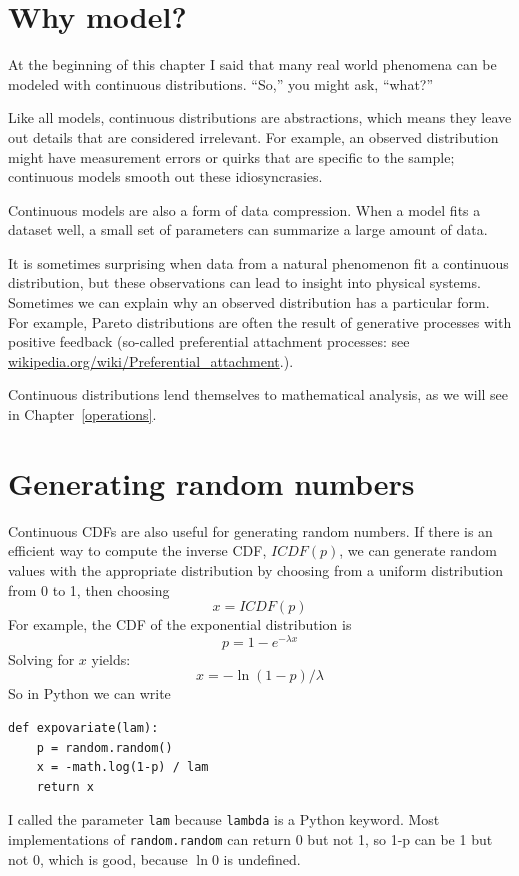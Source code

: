 \documentclass[12pt]{book}
\begin{document}
\section{Why model?}

At the beginning of this chapter I said that many real world phenomena
can be modeled with continuous distributions.  ``So,'' you might ask,
``what?''

Like all models, continuous distributions are abstractions, which
means they leave out details that are considered irrelevant.
For example, an observed distribution might have measurement errors
or quirks that are specific to the sample; continuous models smooth
out these idiosyncrasies.

Continuous models are also a form of data compression.  When a model
fits a dataset well, a small set of parameters can summarize a
large amount of data.

It is sometimes surprising when data from a natural phenomenon fit a
continuous distribution, but these observations can lead to insight
into physical systems.  Sometimes we can explain why an observed
distribution has a particular form.  For example, Pareto distributions
are often the result of generative processes with positive feedback
(so-called preferential attachment processes: see
\url{wikipedia.org/wiki/Preferential_attachment}.).

Continuous distributions lend themselves to mathematical analysis, as
we will see in Chapter~\ref{operations}.


\section{Generating random numbers}

Continuous CDFs are also useful for generating random numbers.
If there is an efficient way to compute the inverse CDF, $ICDF(p)$,
we can generate random values with the appropriate distribution
by choosing from a uniform distribution from 0 to 1, then choosing
%
\[ x = ICDF(p) \]
%
For example, the CDF of the exponential distribution is
%
\[ p = 1 - e^{-\lambda x} \]
%
Solving for $x$ yields:
%
\[ x = -\ln (1-p) / \lambda \]
%
So in Python we can write

\begin{verbatim}
def expovariate(lam):
    p = random.random()
    x = -math.log(1-p) / lam
    return x
\end{verbatim}

I called the parameter \verb"lam" because \verb"lambda" is a Python
keyword.  Most implementations of {\tt random.random} can return 0 but
not 1, so 1-p can be 1 but not 0, which is good, because $\ln 0$ is
undefined.
\end{document}
